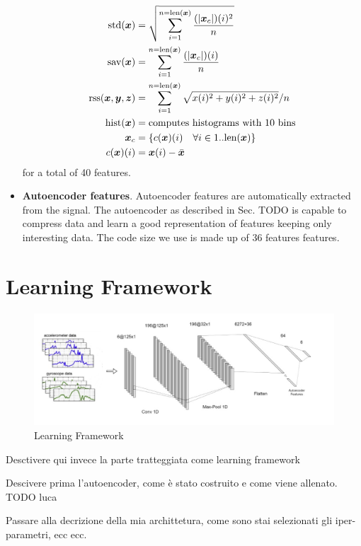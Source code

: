 \begin{itemize}
\begin{align}
    \text{std}(\boldsymbol{x}) &= \sqrt{ \sum_{i=1}^{n = \text{len}(\boldsymbol{x})} \frac{(|\boldsymbol{x}_c|)(i)^2}{n} } \\
    \text{sav}(\boldsymbol{x}) &= \sum_{i=1}^{n = \text{len}(\boldsymbol{x})} \frac{(|\boldsymbol{x}_c|)(i)}{n} \\
    \text{rss}(\boldsymbol{x}, \boldsymbol{y}, \boldsymbol{z}) &= \sum_{i=1}^{n =\text{len}(\boldsymbol{x})} \sqrt{x(i)^2 + y(i)^2 + z(i)^2} / n \\
    \text{hist}(\boldsymbol{x}) &= \text{computes histograms with $10$ bins} \\
    \boldsymbol{x}_c &= \{ c(\boldsymbol{x})(i) \quad \forall i \in 1..\text{len}(\boldsymbol{x}) \} \\
    c(\boldsymbol{x})(i) &= \boldsymbol{x}(i) - \bar{\boldsymbol{x}}
  \end{align}
  for a total of 40 features.
\item \textbf{Autoencoder features}. Autoencoder features are
  automatically extracted from the signal. The autoencoder as
  described in Sec. TODO is capable to compress data and learn a good
  representation of features keeping only interesting data. The code
  size we use is made up of 36 features features.
\end{itemize}

\section{Learning Framework}
\label{sec:learning_framework}

\begin{figure}[h]
	\centering
	\includegraphics[width=1\textwidth]{images/full_architecture.jpg}
	\caption{Learning Framework}
\end{figure}

Desctivere qui invece la parte tratteggiata come learning framework

Descivere prima l'autoencoder, come è stato costruito e come viene allenato. TODO luca

Passare alla decrizione della mia archittetura, come sono stai selezionati gli iper-parametri, ecc ecc.
